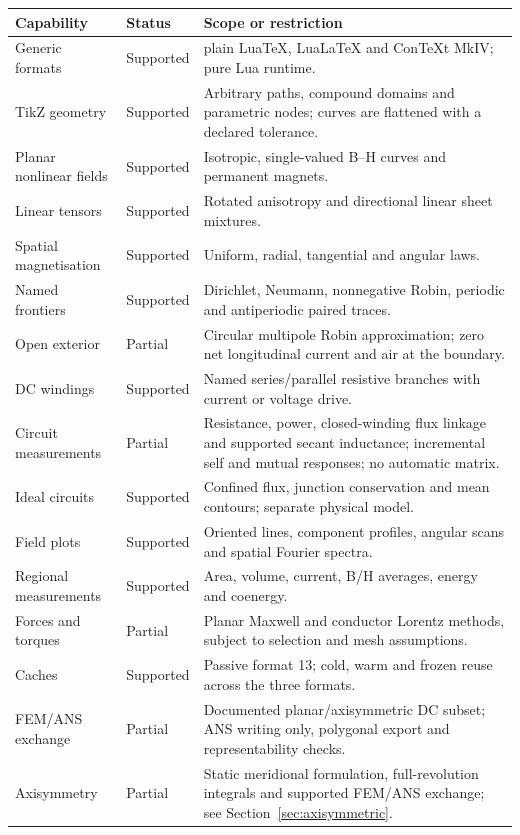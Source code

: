 \begin{longtable}{p{.24\linewidth}p{.13\linewidth}p{.53\linewidth}}
\toprule Capability & Status & Scope or restriction\\
\midrule\endhead
Generic formats & Supported & plain LuaTeX, LuaLaTeX and ConTeXt MkIV; pure Lua runtime.\\
TikZ geometry & Supported & Arbitrary paths, compound domains and parametric nodes; curves are flattened with a declared tolerance.\\
Planar nonlinear fields & Supported & Isotropic, single-valued B--H curves and permanent magnets.\\
Linear tensors & Supported & Rotated anisotropy and directional linear sheet mixtures.\\
Spatial magnetisation & Supported & Uniform, radial, tangential and angular laws.\\
Named frontiers & Supported & Dirichlet, Neumann, nonnegative Robin, periodic and antiperiodic paired traces.\\
Open exterior & Partial & Circular multipole Robin approximation; zero net longitudinal current and air at the boundary.\\
DC windings & Supported & Named series/parallel resistive branches with current or voltage drive.\\
Circuit measurements & Partial & Resistance, power, closed-winding flux linkage and supported secant inductance; incremental self and mutual responses; no automatic matrix.\\
Ideal circuits & Supported & Confined flux, junction conservation and mean contours; separate physical model.\\
Field plots & Supported & Oriented lines, component profiles, angular scans and spatial Fourier spectra.\\
Regional measurements & Supported & Area, volume, current, B/H averages, energy and coenergy.\\
Forces and torques & Partial & Planar Maxwell and conductor Lorentz methods, subject to selection and mesh assumptions.\\
Caches & Supported & Passive format 13; cold, warm and frozen reuse across the three formats.\\
FEM/ANS exchange & Partial & Documented planar/axisymmetric DC subset; ANS writing only, polygonal export and representability checks.\\
Axisymmetry & Partial & Static meridional formulation, full-revolution integrals and supported FEM/ANS exchange; see Section~\ref{sec:axisymmetric}.\\

\end{longtable}
